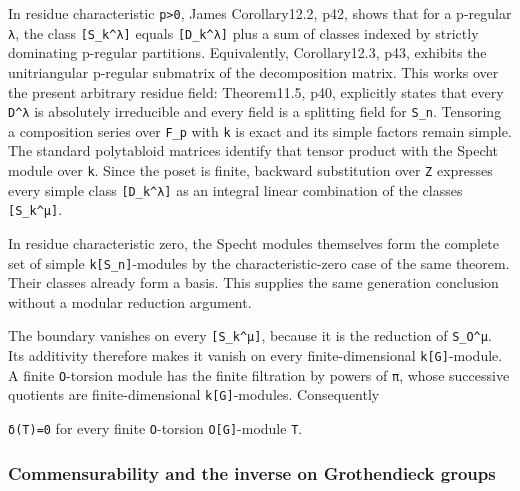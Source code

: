 \documentclass[
  10pt,
]{article}
\begin{document}
In residue characteristic \texttt{\small p>0}, James Corollary12.2, p42,
shows that for a p-regular \texttt{\small λ}, the class
\texttt{\small [\allowbreak{}S\_\allowbreak{}k\textasciicircum{}λ]\allowbreak{}}
equals
\texttt{\small [\allowbreak{}D\_\allowbreak{}k\textasciicircum{}λ]\allowbreak{}}
plus a sum of classes indexed by strictly dominating p-regular
partitions. Equivalently, Corollary12.3, p43, exhibits the unitriangular
p-regular submatrix of the decomposition matrix. This works over the
present arbitrary residue field: Theorem11.5, p40, explicitly states
that every \texttt{\small D\textasciicircum{}λ} is absolutely
irreducible and every field is a splitting field for
\texttt{\small S\_\allowbreak{}n}. Tensoring a composition series over
\texttt{\small F\_\allowbreak{}p} with \texttt{\small k} is exact and
its simple factors remain simple. The standard polytabloid matrices
identify that tensor product with the Specht module over
\texttt{\small k}. Since the poset is finite, backward substitution over
\texttt{\small Z} expresses every simple class
\texttt{\small [\allowbreak{}D\_\allowbreak{}k\textasciicircum{}λ]\allowbreak{}}
as an integral linear combination of the classes
\texttt{\small [\allowbreak{}S\_\allowbreak{}k\textasciicircum{}μ]\allowbreak{}}.

In residue characteristic zero, the Specht modules themselves form the
complete set of simple
\texttt{\small k[\allowbreak{}S\_\allowbreak{}n]\allowbreak{}}-modules
by the characteristic-zero case of the same theorem. Their classes
already form a basis. This supplies the same generation conclusion
without a modular reduction argument.

The boundary vanishes on every
\texttt{\small [\allowbreak{}S\_\allowbreak{}k\textasciicircum{}μ]\allowbreak{}},
because it is the reduction of
\texttt{\small S\_\allowbreak{}O\textasciicircum{}μ}. Its additivity
therefore makes it vanish on every finite-dimensional
\texttt{\small k[\allowbreak{}G]\allowbreak{}}-module. A finite
\texttt{\small O}-torsion module has the finite filtration by powers of
\texttt{\small π}, whose successive quotients are finite-dimensional
\texttt{\small k[\allowbreak{}G]\allowbreak{}}-modules. Consequently

\texttt{\small δ(\allowbreak{}T)\allowbreak{}=\allowbreak{}0} for every
finite \texttt{\small O}-torsion
\texttt{\small O[\allowbreak{}G]\allowbreak{}}-module \texttt{\small T}.

\subsubsection{Commensurability and the inverse on Grothendieck
groups}\label{commensurability-and-the-inverse-on-grothendieck-groups}
\end{document}
